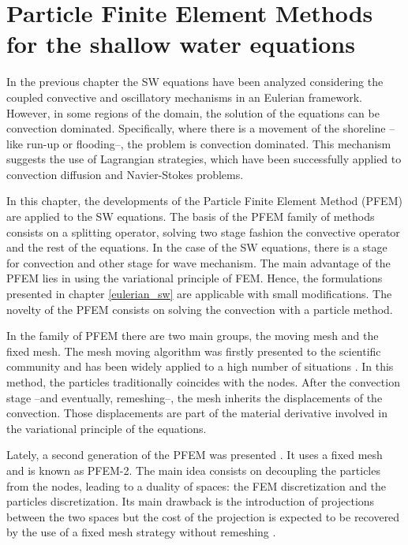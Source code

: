 
\chapter{Particle Finite Element Methods for the shallow water equations}
\label{lagrangian_sw}




In the previous chapter the SW equations have been analyzed considering the coupled convective and oscillatory mechanisms in an Eulerian framework. However, in some regions of the domain, the solution of the equations can be convection dominated. Specifically, where there is a movement of the shoreline --like run-up or flooding--, the problem is convection dominated.
This mechanism suggests the use of Lagrangian strategies, which have been successfully applied to convection diffusion and Navier-Stokes problems.

In this chapter, the developments of the Particle Finite Element Method (PFEM) are applied to the SW equations. The basis of the PFEM family of methods consists on a splitting operator, solving two stage fashion the convective operator and the rest of the equations. In the case of the SW equations, there is a stage for convection and other stage for wave mechanism.
The main advantage of the PFEM lies in using the variational principle of FEM. Hence, the formulations presented in chapter \ref{eulerian_sw} are applicable with small modifications. The novelty of the PFEM consists on solving the convection with a particle method.

In the family of PFEM there are two main groups, the moving mesh and the fixed mesh. The mesh moving algorithm was firstly presented to the scientific community \cite{idelsohn2003,idelsohn2004} and has been widely applied to a high number of situations \cite{larese2008,Salazar2012,onate2008}. In this method, the particles traditionally coincides with the nodes. After the convection stage --and eventually, remeshing--, the mesh inherits the displacements of the convection. Those displacements are part of the material derivative involved in the variational principle of the equations.

Lately, a second generation of the PFEM was presented \cite{idelsohn2012}. It uses a fixed mesh and is known as PFEM-2. The main idea consists on decoupling the particles from the nodes, leading to a duality of spaces: the FEM discretization and the particles discretization. Its main drawback is the introduction of projections between the two spaces but the cost of the projection is expected to be recovered by the use of a fixed mesh strategy without remeshing \cite{idelsohn2015,puigferrat2021}.



